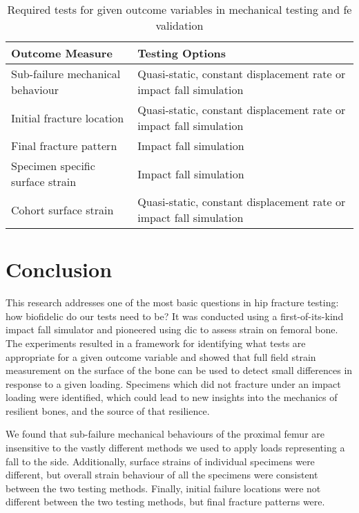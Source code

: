 \begin{table}
\centering
\caption[Required tests for outcomes]{Required tests for given outcome variables in mechanical testing and \acs{fe} validation}
\label{tab:tests_and_outcomes}
\begin{tabularx}{0.75\textwidth}{l >{\centering\arraybackslash}X}
\toprule
Outcome Measure & Testing Options \\
\midrule
Sub-failure mechanical behaviour & Quasi-static, constant displacement rate or impact fall simulation \\[1EX]
Initial fracture location & Quasi-static, constant displacement rate or impact fall simulation \\[1EX]
Final fracture pattern & Impact fall simulation \\[1EX]
Specimen specific surface strain & Impact fall simulation \\[1EX]
Cohort surface strain & Quasi-static, constant displacement rate or impact fall simulation \\
\bottomrule 
\end{tabularx}
\end{table}

\section{Conclusion}
\label{sec:discussion_conclusion}
This research addresses one of the most basic questions in hip fracture testing: how biofidelic do our tests need to be?
It was conducted using a first-of-its-kind impact fall simulator and pioneered using \ac{dic} to assess strain on femoral bone.
The experiments resulted in a framework for identifying what tests are appropriate for a given outcome variable and showed that full field strain measurement on the surface of the bone can be used to detect small differences in response to a given loading.
Specimens which did not fracture under an impact loading were identified, which could lead to new insights into the mechanics of resilient bones, and the source of that resilience.

We found that sub-failure mechanical behaviours of the proximal femur are insensitive to the vastly different methods we used to apply loads representing a fall to the side.
Additionally, surface strains of individual specimens were different, but overall strain behaviour of all the specimens were consistent between the two testing methods.
Finally, initial failure locations were not different between the two testing methods, but final fracture patterns were.

